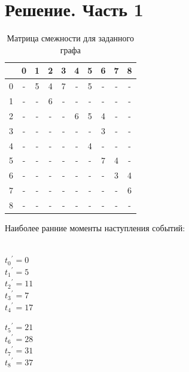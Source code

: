 \documentclass[a4paper,14pt]{extarticle}
\begin{document}
\section{Решение. Часть 1}

\begin{table}[H]
\caption{Матрица смежности для заданного графа}
\label{tabular:timesandtenses}
\begin{center}
\begin{tabular}{|c|c|c|c|c|c|c|c|c|c|}
\hline
  & 0 & 1 & 2 & 3 & 4 & 5 & 6 & 7 & 8\\ \hline
0 & - & 5 & 4 & 7 & - & 5 & - & - & -\\ \hline
1 & - & - & 6 & - & - & - & - & - & -\\ \hline
2 & - & - & - & - & 6 & 5 & 4 & - & -\\ \hline
3 & - & - & - & - & - & - & 3 & - & -\\ \hline
4 & - & - & - & - & - & 4 & - & - & -\\ \hline
5 & - & - & - & - & - & - & 7 & 4 & -\\ \hline
6 & - & - & - & - & - & - & - & 3 & 4\\ \hline
7 & - & - & - & - & - & - & - & - & 6\\ \hline
8 & - & - & - & - & - & - & - & - & -\\ \hline
\end{tabular}
\end{center}
\end{table}

\newpage

Наиболее ранние моменты наступления событий:\\\\

\begin{minipage}{0.4\textwidth}
\begin{center}
 ${t_0}^{'} = 0$ \\
 ${t_1}^{'} = 5$ \\
 ${t_2}^{'} = 11$ \\
 ${t_3}^{'} = 7$ \\
 ${t_4}^{'} = 17$
\end{center}
\end{minipage}
\hfill
\begin{minipage}{0.5\textwidth}
\begin{center}
 ${t_5}^{'} = 21$ \\
 ${t_6}^{'} = 28$ \\
 ${t_7}^{'} = 31$ \\
 ${t_8}^{'} = 37$
\end{center}
\end{minipage}\\\\\\
\end{document}
